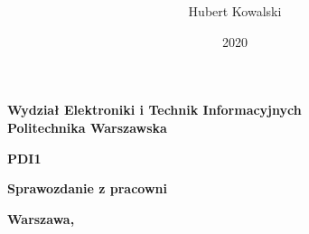 \documentclass[a4paper,titlepage,11pt,twosides,floatssmall]{mwrep}
\begin{document}
	\frenchspacing
	\pagestyle{plain} 
	
	\title{\bf\vskip 0.1cm}
	\author{Hubert Kowalski}
	\date{2020}
	
	\makeatletter
	\renewcommand{\maketitle}{\begin{titlepage}
			\begin{center}{\LARGE {\bf
						Wydział Elektroniki i Technik Informacyjnych}}\\
				\vspace{0.4cm}
				{\LARGE {\bf Politechnika Warszawska}}\\
				\vspace{0.3cm}
			\end{center}
			\vspace{5cm}
			\begin{center}
				{\bf \LARGE PDI1 \vskip 0.1cm}
			\end{center}
			\vspace{1cm}
			\begin{center}
				{\bf \LARGE Sprawozdanie z pracowni \vskip 0.1cm}
			\end{center}
			\vspace{1cm}
			\begin{center}
				{\bf \LARGE \@title}
			\end{center}
			
			\vspace{2cm}
			\begin{center}
				{\bf \Large \@author \par}
			\end{center}
			\vspace*{\stretch{6}}
			\begin{center}
				\bf{\large{Warszawa, \@date\vskip 0.1cm}}
			\end{center}
		\end{titlepage}
	}
	
	
	\maketitle
	\tableofcontents
	
	
	
	
	
	
	
	
	
\end{document}
